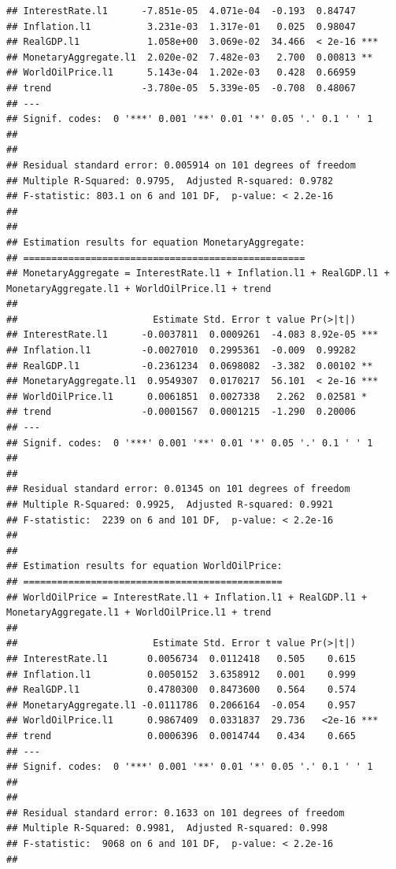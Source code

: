 \documentclass[11pt,preprint, authoryear]{elsarticle}
\numberwithin{equation}{section}
\numberwithin{figure}{section}
\numberwithin{table}{section}
\begin{document}
\begin{verbatim}
## InterestRate.l1      -7.851e-05  4.071e-04  -0.193  0.84747    
## Inflation.l1          3.231e-03  1.317e-01   0.025  0.98047    
## RealGDP.l1            1.058e+00  3.069e-02  34.466  < 2e-16 ***
## MonetaryAggregate.l1  2.020e-02  7.482e-03   2.700  0.00813 ** 
## WorldOilPrice.l1      5.143e-04  1.202e-03   0.428  0.66959    
## trend                -3.780e-05  5.339e-05  -0.708  0.48067    
## ---
## Signif. codes:  0 '***' 0.001 '**' 0.01 '*' 0.05 '.' 0.1 ' ' 1
## 
## 
## Residual standard error: 0.005914 on 101 degrees of freedom
## Multiple R-Squared: 0.9795,  Adjusted R-squared: 0.9782 
## F-statistic: 803.1 on 6 and 101 DF,  p-value: < 2.2e-16 
## 
## 
## Estimation results for equation MonetaryAggregate: 
## ================================================== 
## MonetaryAggregate = InterestRate.l1 + Inflation.l1 + RealGDP.l1 + MonetaryAggregate.l1 + WorldOilPrice.l1 + trend 
## 
##                        Estimate Std. Error t value Pr(>|t|)    
## InterestRate.l1      -0.0037811  0.0009261  -4.083 8.92e-05 ***
## Inflation.l1         -0.0027010  0.2995361  -0.009  0.99282    
## RealGDP.l1           -0.2361234  0.0698082  -3.382  0.00102 ** 
## MonetaryAggregate.l1  0.9549307  0.0170217  56.101  < 2e-16 ***
## WorldOilPrice.l1      0.0061851  0.0027338   2.262  0.02581 *  
## trend                -0.0001567  0.0001215  -1.290  0.20006    
## ---
## Signif. codes:  0 '***' 0.001 '**' 0.01 '*' 0.05 '.' 0.1 ' ' 1
## 
## 
## Residual standard error: 0.01345 on 101 degrees of freedom
## Multiple R-Squared: 0.9925,  Adjusted R-squared: 0.9921 
## F-statistic:  2239 on 6 and 101 DF,  p-value: < 2.2e-16 
## 
## 
## Estimation results for equation WorldOilPrice: 
## ============================================== 
## WorldOilPrice = InterestRate.l1 + Inflation.l1 + RealGDP.l1 + MonetaryAggregate.l1 + WorldOilPrice.l1 + trend 
## 
##                        Estimate Std. Error t value Pr(>|t|)    
## InterestRate.l1       0.0056734  0.0112418   0.505    0.615    
## Inflation.l1          0.0050152  3.6358912   0.001    0.999    
## RealGDP.l1            0.4780300  0.8473600   0.564    0.574    
## MonetaryAggregate.l1 -0.0111786  0.2066164  -0.054    0.957    
## WorldOilPrice.l1      0.9867409  0.0331837  29.736   <2e-16 ***
## trend                 0.0006396  0.0014744   0.434    0.665    
## ---
## Signif. codes:  0 '***' 0.001 '**' 0.01 '*' 0.05 '.' 0.1 ' ' 1
## 
## 
## Residual standard error: 0.1633 on 101 degrees of freedom
## Multiple R-Squared: 0.9981,  Adjusted R-squared: 0.998 
## F-statistic:  9068 on 6 and 101 DF,  p-value: < 2.2e-16 
## 

\end{verbatim}
\end{document}
